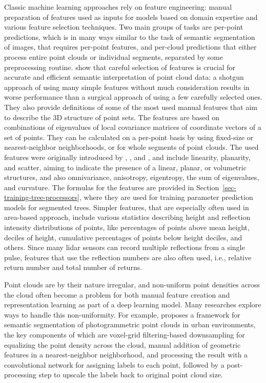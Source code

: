 Classic machine learning approaches rely on feature engineering: manual preparation of features used as inputs for models based on domain expertise and various feature selection techniques.
Two main groups of tasks are per-point predictions, which is in many ways similar to the task of semantic segmentation of images, that requires per-point features, and per-cloud predictions that either process entire point clouds or individual segments, separated by some preprocessing routine.
\citet{weinmannFeatureRelevanceAssessment2013} show that careful selection of features is crucial for accurate and efficient semantic interpretation of point cloud data: a shotgun approach of using many simple features without much consideration results in worse performance than a surgical approach of using a few carefully selected ones.
They also provide definitions of some of the most used manual features that aim to describe the 3D structure of point sets.
The features are based on combinations of eigenvalues of local covariance matrices of coordinate vectors of a set of points.
They can be calculated on a per-point basis by using fixed-size or nearest-neighbor neighborhoods, or for whole segments of point clouds.
The used features were originally introduced by \citet{westContextdrivenAutomatedTarget2004}, \citet{paulyEfficientSimplificationPointsampled2002}, and \citet{malletRelevanceAssessmentFullwaveform2011}, and include linearity, planarity, and scatter, aiming to indicate the presence of a linear, planar, or volumetric structures, and also omnivariance, anisotropy, eigentropy, the sum of eigenvalues, and curvature.
The formulas for the features are provided in Section~\ref{sec-training-tree-processors}, where they are used for training parameter prediction models for segmented trees.
Simpler features, that are especially often used in area-based approach, include various statistics describing height and reflection intensity distributions of points, like percentages of points above mean height, deciles of height, cumulative percentages of points below height deciles, and others.
Since many \gls{lidar} sensors can record multiple reflections from a single pulse, features that use the reflection numbers are also often used, i.e., relative return number and total number of returns.

Point clouds are by their nature irregular, and non-uniform point densities across the cloud often become a problem for both manual feature creation and representation learning as part of a deep learning model.
Many researches explore ways to handle this non-uniformity.
For example, \citet{ozdemirDeepLearningFramework2021} proposes a framework for semantic segmentation of photogrammetric point clouds in urban environments, the key components of which are voxel-grid filtering-based downsampling for equalizing the point density across the cloud, manual addition of geometric features in a nearest-neighbor neighborhood, and processing the result with a convolutional network for assigning labels to each point, followed by a post-processing step to upscale the labels back to original point cloud size.

